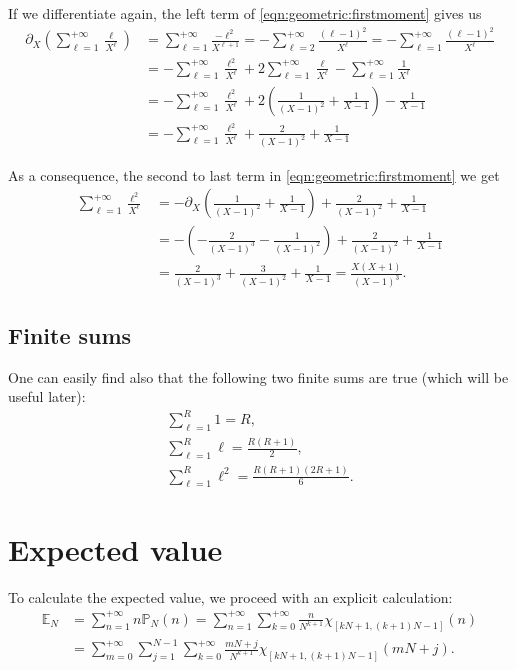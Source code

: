 \documentclass[a4paper,oneside,11pt]{book}
\renewcommand{\Pr}{\mathbb{P}}
\begin{document}
If we differentiate again, the left term of \eqref{eqn:geometric:firstmoment} gives us
\begin{align}
	\partial_X\left(\sum_{\ell=1}^{+\infty}\frac{\ell}{X^\ell}\right)
	&=\sum_{\ell=1}^{+\infty}\frac{-\ell^2}{X^{\ell+1}}
	=-\sum_{\ell=2}^{+\infty}\frac{\left(\ell-1\right)^2}{X^\ell}
	=-\sum_{\ell=1}^{+\infty}\frac{\left(\ell-1\right)^2}{X^\ell}
\\
	&=-\sum_{\ell=1}^{+\infty}\frac{\ell^2}{X^\ell}
	+2\sum_{\ell=1}^{+\infty}\frac\ell{X^\ell}
	-\sum_{\ell=1}^{+\infty}\frac1{X^\ell}
\\
	&=-\sum_{\ell=1}^{+\infty}\frac{\ell^2}{X^\ell}
	+2\left(
		\frac1{\left(X-1\right)^2}
		+\frac1{X-1}
	\right)
	-\frac1{X-1}
\\
	&=-\sum_{\ell=1}^{+\infty}\frac{\ell^2}{X^\ell}
	+\frac2{\left(X-1\right)^2}
	+\frac1{X-1}
\end{align}

As a consequence, the second to last term in \eqref{eqn:geometric:firstmoment} we get
\begin{align}
	\sum_{\ell=1}^{+\infty}\frac{\ell^2}{X^\ell}
	&=-\partial_X\left(
		\frac1{\left(X-1\right)^2}
		+\frac1{X-1}
	\right)
	+\frac2{\left(X-1\right)^2}
	+\frac1{X-1}
\\
	&=-\left(
		-\frac2{\left(X-1\right)^3}
		-\frac1{\left(X-1\right)^2}
	\right)
	+\frac2{\left(X-1\right)^2}
	+\frac1{X-1}
\\
	&=\frac2{\left(X-1\right)^3}
	+\frac3{\left(X-1\right)^2}
	+\frac1{X-1}
	=\frac{X\left(X+1\right)}{\left(X-1\right)^3}.
\end{align}

\subsection{Finite sums}
One can easily find also that the following two finite sums are true (which will be useful later):
\begin{gather}
\label{eqn:sums:ones}
	\sum_{\ell=1}^{R}1=R,
\\
\label{eqn:sums:elements}
	\sum_{\ell=1}^{R}\ell=\frac{R\left(R+1\right)}{2},
\\
\label{eqn:sums:squares}
	\sum_{\ell=1}^{R}\ell^2=\frac{R\left(R+1\right)\left(2R+1\right)}{6}.
\end{gather}

\section{Expected value}
To calculate the expected value, we proceed with an explicit calculation:
\begin{align}
	\mathbb{E}_N&=\sum_{n=1}^{+\infty}n\Pr_N\left(n\right)
	=\sum_{n=1}^{+\infty}\sum_{k=0}^{+\infty}\frac n{N^{k+1}}\chi_{[kN+1,\left(k+1\right)N-1]}(n)
\\
	&=\sum_{m=0}^{+\infty}\sum_{j=1}^{N-1}\sum_{k=0}^{+\infty}\frac{mN+j}{N^{k+1}}\chi_{[kN+1,\left(k+1\right)N-1]}\left(mN+j\right).
\end{align}
\end{document}

